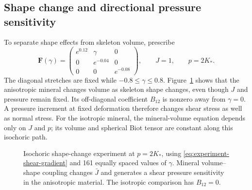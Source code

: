 \subsection{Shape change and directional pressure sensitivity}
To separate shape effects from skeleton volume, prescribe
\begin{equation}
 \mathbf F(\gamma)=
 \begin{pmatrix}
 e^{0.12}&\gamma&0\\
 0&e^{-0.04}&0\\
 0&0&e^{-0.08}
 \end{pmatrix},\qquad J=1,\qquad p=2K_*.
 \label{eq:experiment-shear-gradient}
\end{equation}
The diagonal stretches are fixed while \(-0.8\le\gamma\le0.8\).
Figure~\ref{fig:spherical-shear} shows that the anisotropic mineral changes
volume as skeleton shape changes, even though \(J\) and pressure remain
fixed. Its off-diagonal coefficient \(B_{12}\) is nonzero away from
\(\gamma=0\). A pressure increment at fixed deformation therefore changes
shear stress as well as normal stress. For the isotropic mineral, the
mineral-volume equation depends only on \(J\) and \(p\); its volume and
spherical Biot tensor are constant along this isochoric path.
\begin{figure}[htbp]
 \centering
 \caption{Isochoric shape-change experiment at \(p=2K_*\), using
 \eqref{eq:experiment-shear-gradient} and 161 equally spaced values of
 \(\gamma\). Mineral volume--shape coupling changes \(\bar J\) and
 generates a shear pressure sensitivity in the anisotropic material.
 The isotropic comparison has \(B_{12}=0\).}
 \label{fig:spherical-shear}
\end{figure}

